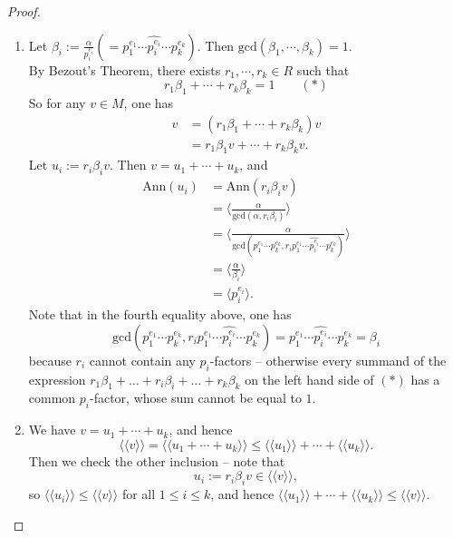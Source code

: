 \documentclass[12pt]{amsbook}
\begin{document}
\begin{proof}
    \begin{enumerate}
        \item Let $\beta_i:=\frac{\alpha}{p_i^{e_i}}(=p_1^{e_1}\cdots\widehat{p_i^{e_i}}\cdots p_k^{e_k})$. Then
        $\mathrm{gcd}(\beta_1,\cdots,\beta_k)=1$.\\
        By Bezout's Theorem, there exists $r_1,\cdots,r_k\in R$ such that $$r_1\beta_1+\cdots+r_k\beta_k=1 \quad \quad (\ast)$$
        So for any $v\in M$, one has
        \begin{align*}
            v&=(r_1\beta_1+\cdots+r_k\beta_k)v\\
            &=r_1\beta_1v+\cdots+r_k\beta_kv.
        \end{align*}
        Let $u_i:=r_i\beta_iv$. Then $v = u_1+\cdots+u_k$, and
        \begin{align*}
            \mathrm{Ann}(u_i)&=\mathrm{Ann}(r_i\beta_iv)\\
            &=\langle\frac{\alpha}{\mathrm{gcd}(\alpha , r_i\beta_i)}\rangle\\
            &=\langle\frac{\alpha}{\mathrm{gcd}(p_1^{e_1}\cdots p_k^{e_k} , r_ip_1^{e_1}\cdots\hat{p_i^{e_i}}\cdots p_k^{e_k})}\rangle\\
            &=\langle\frac{\alpha}{\beta_i}\rangle\\
            &=\langle p_i^{e_i}\rangle.
        \end{align*}
        Note that in the fourth equality above, one has $$\mathrm{gcd}(p_1^{e_1}\cdots p_k^{e_k} , r_ip_1^{e_1}\cdots\hat{p_i^{e_i}}\cdots p_k^{e_k}) = p_1^{e_1}\cdots\hat{p_i^{e_i}}\cdots p_k^{e_k} = \beta_i$$ because $r_i$ cannot contain any $p_i$-factors -- otherwise every summand of the expression $r_1\beta_1 + \dots + r_i\beta_i + \dots +r_k\beta_k$ on the left hand side of $(\ast)$ has a common $p_i$-factor, whose sum cannot be equal to $1$.
        
        \item We have $v = u_1+\cdots+u_k$, and hence
        $$\langle\langle v\rangle\rangle=\langle\langle u_1+\cdots+u_k\rangle\rangle\leq\langle\langle u_1\rangle\rangle+\cdots+\langle\langle u_k\rangle\rangle.$$
        Then we check the other inclusion -- note that 
        $$u_i := r_i\beta_iv \in \langle \langle v \rangle \rangle,$$
        so $\langle \langle u_i \rangle \rangle \leq \langle \langle v \rangle \rangle$ for all $1 \leq i \leq k$,
        and hence $\langle\langle u_1\rangle\rangle+\cdots+\langle\langle u_k\rangle\rangle \leq \langle\langle v\rangle\rangle.$
        \medskip
        

\end{enumerate}
\end{proof}
\end{document}
